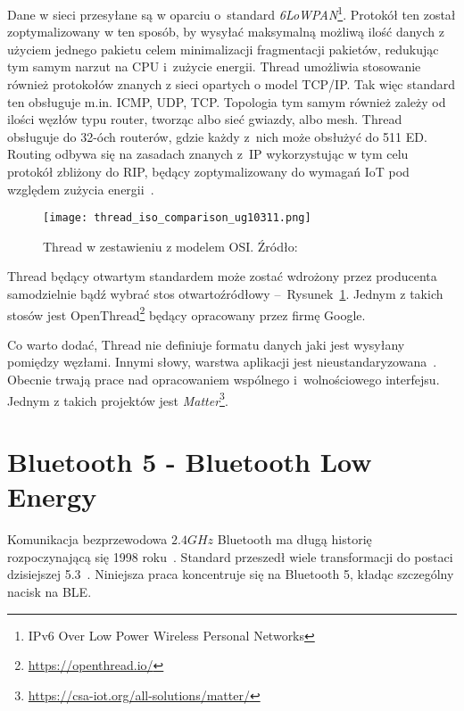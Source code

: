 Dane w sieci przesyłane są w oparciu o~standard \textit{6LoWPAN}\footnote{IPv6 Over Low Power Wireless Personal Networks}.
Protokół ten został zoptymalizowany w ten sposób, by wysyłać maksymalną możliwą ilość danych z użyciem jednego
pakietu celem minimalizacji fragmentacji pakietów, redukując tym samym narzut na CPU i~zużycie energii.
Thread umożliwia stosowanie również protokołów znanych z sieci opartych o model TCP/IP. Tak więc
standard ten obsługuje m.in. \gls{ICMP}, \gls{UDP}, \gls{TCP}. Topologia tym samym również zależy od ilości
węzłów typu router, tworząc albo sieć gwiazdy, albo mesh. Thread obsługuje do 32-óch routerów, gdzie każdy
z~nich może obsłużyć do 511 \gls{ED}. Routing odbywa się na zasadach znanych z~\gls{IP}
wykorzystując w tym celu protokół zbliżony do \gls{RIP}, będący zoptymalizowany do wymagań
IoT pod względem zużycia energii~\cite{silicon_laboratories_ug10311_2022}.

\begin{figure}[!ht]
	\centering \texttt{[image: thread\_iso\_comparison\_ug10311.png]}
	\caption{Thread w zestawieniu z modelem OSI. Źródło:~\cite{silicon_laboratories_ug10311_2022}}
	\label{rys:thread_iso_comparison_ug10311}
\end{figure}

Thread będący otwartym standardem może zostać wdrożony przez producenta samodzielnie bądź wybrać stos otwartoźródłowy --~Rysunek~\ref{rys:thread_iso_comparison_ug10311}.
Jednym z takich stosów jest OpenThread\footnote{\url{https://openthread.io/}} będący opracowany przez firmę Google.

Co warto dodać, Thread nie definiuje formatu danych jaki jest wysyłany pomiędzy węzłami. Innymi słowy,
warstwa aplikacji jest nieustandaryzowana~\cite{silicon_laboratories_ug10311_2022}. Obecnie trwają
prace nad opracowaniem wspólnego i~wolnościowego interfejsu. Jednym z takich projektów jest \textit{Matter}\footnote{\url{https://csa-iot.org/all-solutions/matter/}}.

\section{Bluetooth 5 - Bluetooth Low Energy}\label{sec:ble}
Komunikacja bezprzewodowa $2.4GHz$ Bluetooth ma długą historię rozpoczynającą się 1998 roku~\cite{noauthor_bluetooth_nodate-1}.
Standard przeszedł wiele transformacji do postaci dzisiejszej 5.3~\cite{woolley_bluetooth_2021}. Niniejsza praca
koncentruje się na Bluetooth 5, kładąc szczególny nacisk na \gls{BLE}.

